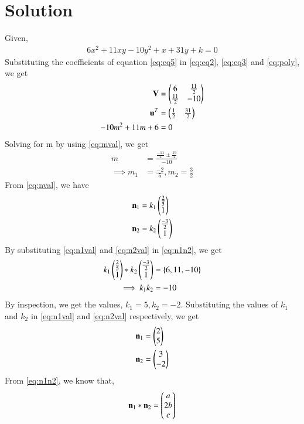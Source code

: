 \documentclass[journal,12pt,twocolumn]{IEEEtran}
\begin{document}
\section{Solution}
Given, 
\begin{align}
	6x^2 + 11xy - 10y^2 + x + 31y + k =0 \label{eq:eq5}
\end{align}
Substituting the coefficients of equation \eqref{eq:eq5} in \eqref{eq:eq2}, \eqref{eq:eq3} and \eqref{eq:poly}, we get
\begin{align}
	\mathbf{V} &= \begin{pmatrix}6 & \frac{11}{2} \\ \frac{11}{2} & -10\end{pmatrix}\\
	\mathbf{u}^T &= \begin{pmatrix}\frac{1}{2} & \frac{31}{2}\end{pmatrix} \\
	-10m^2 + 11m + 6 &= 0
\end{align}
Solving for m by using \eqref{eq:mval}, we get
\begin{align}
	m &= \frac{\frac{-11}{2} \pm \frac{19}{2}}{-10} \\ 
	\implies m_1 &= \frac{-2}{5}, m_2 = \frac{3}{2} 
\end{align}
From \eqref{eq:nval}, we have
\begin{align}
	\mathbf{n}_1 &= k_1 \begin{pmatrix} \frac{2}{5} \\ 1\end{pmatrix}  \label{eq:n1val}\\
	\mathbf{n}_2 &= k_2 \begin{pmatrix}\frac{-3}{2} \\ 1\end{pmatrix} \label{eq:n2val}
\end{align}
By substituting \eqref{eq:n1val} and \eqref{eq:n2val} in \eqref{eq:n1n2}, we get
\begin{align}
	k_1 \begin{pmatrix} \frac{2}{5} \\ 1\end{pmatrix} * k_2 \begin{pmatrix}\frac{-3}{2} \\ 1\end{pmatrix} &= \left\{6, 11, -10\right\}\\
	\implies k_1k_2 &= -10
\end{align} 
By inspection, we get the values, $k_1 = 5, k_2 = -2$. Substituting the values of $k_1$ and $k_2$ in \eqref{eq:n1val} and \eqref{eq:n2val} respectively, we get
\begin{align}
	\mathbf{n}_1 &= \begin{pmatrix}2 \\ 5\end{pmatrix} \label{eq:n1}\\
	\mathbf{n}_2 &= \begin{pmatrix}3 \\ -2\end{pmatrix} \label{eq:n2}
\end{align}
From \eqref{eq:n1n2}, we know that,
\begin{align}
	\mathbf{n}_1 * \mathbf{n}_2 = \begin{pmatrix}a\\ 2b\\ c\end{pmatrix}
\end{align}	
\end{document}
